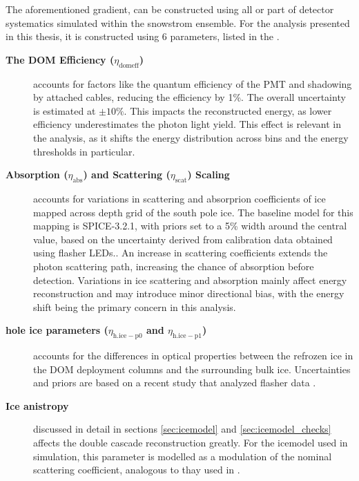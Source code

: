 The aforementioned gradient, can be constructed using all or part of detector systematics simulated within the snowstrom ensemble. For the analysis presented in this thesis, it is constructed using 6 parameters, listed in the . 
\begin{description}
    \item [\textbf{The DOM Efficiency ($\eta_{\mathrm{domeff}}$)}] accounts for factors like the quantum efficiency of the PMT and shadowing by attached cables, reducing the efficiency by 1\%. The overall uncertainty is estimated at $\pm10\%$. This impacts the reconstructed energy, as lower efficiency underestimates the photon light yield. This effect is relevant in the analysis, as it shifts the energy distribution across bins and the energy thresholds in particular.
    \item [\textbf{Absorption ($\eta_{\mathrm{abs}}$) and Scattering ($\eta_{\mathrm{scat}}$) Scaling}] accounts for variations in scattering and absorprion coefficients of ice mapped across depth grid of the south pole ice. The baseline model for this mapping is SPICE-3.2.1, with priors set to a 5\% width around the central value, based on the uncertainty derived from calibration data obtained using flasher LEDs.. An increase in scattering coefficients extends the photon scattering path, increasing the chance of absorption before detection. Variations in ice scattering and absorption mainly affect energy reconstruction and may introduce minor directional bias, with the energy shift being the primary concern in this analysis.  
    \item [\textbf{hole ice parameters ($\eta_{\mathrm{h.ice-p0}}$ and $\eta_{\mathrm{h.ice-p1}}$)}] accounts for the differences in optical properties between the refrozen ice in the DOM deployment columns and the surrounding bulk ice. Uncertainties and priors are based on a recent study that analyzed flasher data .
    \item [\textbf{Ice anistropy}] discussed in detail in sections \ref{sec:icemodel} and \ref{sec:icemodel_checks} affects the double cascade reconstruction greatly. For the icemodel used in simulation, this parameter is modelled as a modulation of the nominal scattering coefficient, analogous to thay used in .
\end{description}



